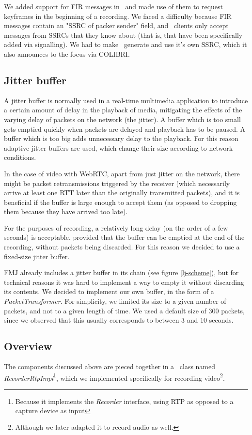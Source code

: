 \documentclass[twoside,openright,a4paper,12pt,english]{article}
\begin{document}
We added support for FIR messages in \lj\ and made use of them to request
keyframes in the beginning of a recording. We faced a difficulty because FIR
messages contain an "SSRC of packer sender" field, and \wrtc\ clients only
accept messages from SSRCs that they know about (that is, that have been
specifically added via signalling). We had to make \jvb\ generate and use it's
own SSRC, which it also announces to the focus via COLIBRI.

\subsection{Jitter buffer}
\label{video-jb}
A jitter buffer is normally used in a real-time multimedia application to
introduce a certain amount of delay in the playback of media,
mitigating the effects of the varying delay of packets on the network
(the jitter). A buffer which is too small gets emptied quickly when packets are
delayed and playback has
to be paused. A buffer which is too big adds unnecessary delay to the playback.
For this reason adaptive jitter buffers are used, which change their
size according to network conditions.

In the case of video with WebRTC, apart from just jitter on the network, there
might be packet retransmissions triggered by the receiver (which necessarily
arrive at least one RTT later than the originally transmitted packets), and it is beneficial if the
buffer is large enough to accept them (as opposed to dropping them because they
have arrived too late).

For the purposes of recording, a relatively long delay (on the order of a few
seconds) is acceptable, provided that the buffer can be emptied at the end of the recording,
without packets being discarded. For this reason we decided to use a fixed-size
jitter buffer.

FMJ already includes a jitter buffer in its chain (see figure \ref{lj-scheme}), but
for technical reasons it was hard to implement a way to empty it without
discarding its contents. We decided to implement our own buffer, in the form of
a \emph{PacketTransformer}. For simplicity, we limited its size to a given
number of packets, and not to a given length of time. We used a default size
of 300 packets, since we observed that this usually corresponds to between 3
and 10 seconds.

\subsection{Overview}
\label{recording-video-overview}
The components discussed above are pieced together in a \lj\ class named \emph{RecorderRtpImpl}\footnote{Because it implements the \emph{Recorder} interface, using RTP as opposed to a capture device as input},
which we implemented specifically for recording video\footnote{Although we
later adapted it to record audio as well.}.
\end{document}
